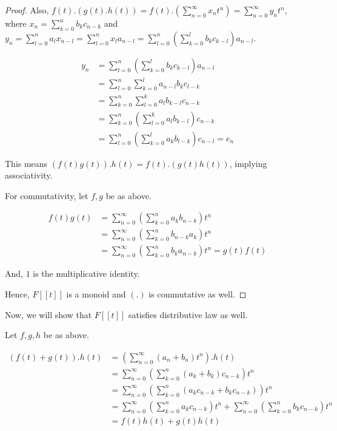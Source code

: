 \documentclass[12pt,a4paper]{article}
\theoremstyle{definition}
\begin{document}
\begin{flushleft}
\begin{proof}
	Also, $f(t).(g(t).h(t)) = f(t).(\sum_{n=0}^{\infty} x_nt^n) = \sum_{n=0}^{\infty} y_nt^n$, where $x_n = \sum_{k=0}^{n} b_kc_{n-k}$ and $y_n = \sum_{l=0}^{n} a_lx_{n-l} = \sum_{l=0}^{n} x_{l}a_{n-l} = \sum_{l=0}^{n}(\sum_{k=0}^{l} b_kc_{k-l})a_{n-l}$.

	\begin{align*}
		y_n &= \sum_{l=0}^{n}(\sum_{k=0}^{l} b_kc_{k-l})a_{n-l} \\
		&= \sum_{l=0}^{n} \sum_{k=0}^{l} a_{n-l}b_kc_{l-k} \\
		&= \sum_{k=0}^{n} \sum_{l=0}^{k} a_lb_{k-l}c_{n-k} \\
		&= \sum_{k=0}^{n} (\sum_{l=0}^{k} a_lb_{k-l}) c_{n-k} \\
		&= \sum_{l=0}^{n} (\sum_{k=0}^{l} a_kb_{l-k}) c_{n-l} = e_n
	\end{align*}

	This means $(f(t)g(t)).h(t) = f(t).(g(t)h(t))$, implying associativity.

	\medskip

	For commutativity, let $f,g$ be as above.

	\begin{align*}
		f(t)g(t) &= \sum_{n=0}^{\infty} (\sum_{k=0}^{n} a_kb_{n-k})t^n \\
		&= \sum_{n=0}^{\infty} (\sum_{k=0}^{n} b_{n-k}a_k)t^n \\
		&= \sum_{n=0}^{\infty} (\sum_{k=0}^{n} b_{k}a_{n-k})t^n = g(t)f(t)
	\end{align*}

	\medskip

	And, $1$ is the multiplicative identity.

	Hence, $F[[t]]$ is a monoid and $(.)$ is commutative as well.
\end{proof}

Now, we will show that $F[[t]]$ satisfies distributive law as well.

Let $f,g,h$ be as above.

\begin{align*}
	(f(t) + g(t)).h(t) &= (\sum_{n=0}^{\infty} (a_n + b_n) t^n).h(t) \\
	&= \sum_{n=0}^{\infty} (\sum_{k=0}^{n} (a_k + b_k)c_{n-k}) t^n \\
	&= \sum_{n=0}^{\infty} (\sum_{k=0}^{n}(a_kc_{n-k} + b_kc_{n-k}))t^n \\
	&= \sum_{n=0}^{\infty} (\sum_{k=0}^{n} a_kc_{n-k}) t^n + \sum_{n=0}^{\infty} (\sum_{k=0}^{n} b_kc_{n-k}) t^n \\
	&= f(t)h(t) + g(t)h(t)
\end{align*}


\end{flushleft}
\end{document}
